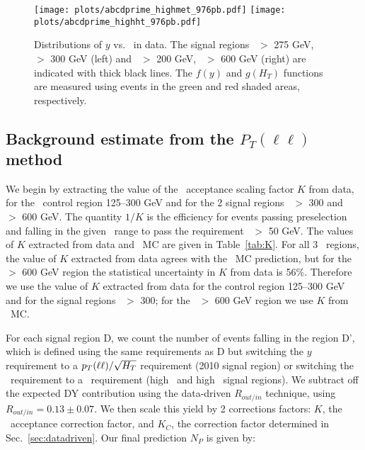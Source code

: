 \begin{figure}[hbt]
\begin{center}
\texttt{[image: plots/abcdprime\_highmet\_976pb.pdf]}
\texttt{[image: plots/abcdprime\_highht\_976pb.pdf]}
\caption{\label{fig:abcdprimedata}\protect 
Distributions of $y$ vs. \Ht\ in data. The signal regions \met\ $>$ 275 GeV, \Ht\ $>$ 300 GeV (left)
and \met\ $>$ 200 GeV, \Ht\ $>$ 600 GeV (right) are indicated with thick black lines. 
The $f(y)$ and $g(H_T)$ 
functions are measured using events in the green and red shaded areas, respectively.
}
\end{center}
\end{figure}

\subsection{Background estimate from the $P_T(\ell\ell)$ method}
\label{sec:victoryres}

We begin by extracting the value of the \met\ acceptance scaling factor $K$ from data,
for the \Ht\ control region 125--300 GeV and for the 2 signal regions \Ht\ $>$ 300 and
\Ht\ $>$ 600 GeV. The quantity $1/K$ is the efficiency for events passing preselection
and falling in the given \Ht\ range to pass the requirement \ptll\ $>$ 50 GeV.
The values of $K$ extracted from data and \ttbar\ MC are given in Table~\ref{tab:K}.
For all 3 \Ht\ regions, the value of $K$ extracted from data agrees with the 
\ttbar\ MC prediction, but for the \Ht\ $>$ 600 GeV region the statistical uncertainty
in $K$ from data is 56\%. Therefore we use the value of $K$ extracted from
data for the control region 125--300 GeV and for the signal regions \Ht\ $>$ 300;
for the \Ht\ $>$ 600 GeV region we use $K$ from \ttbar\ MC.

For each signal region D, we count the number of events falling in the region D', which is defined
using the same requirements as D but switching the $y$ requirement to a $p_T(\ell\ell)/\sqrt{H_T}$ requirement (2010 signal region)
or switching the \met\ requirement to a \ptll\ requirement (high \met\ and high \Ht\ signal regions).
We subtract off the expected DY contribution using the data-driven $R_{out/in}$ technique, using $R_{out/in} = 0.13 \pm 0.07$.
We then scale this yield by 2 corrections factors:
$K$, the \met\ acceptance correction factor, and $K_C$, the correction factor determined in Sec.~\ref{sec:datadriven}.
Our final prediction $N_P$ is given by:

